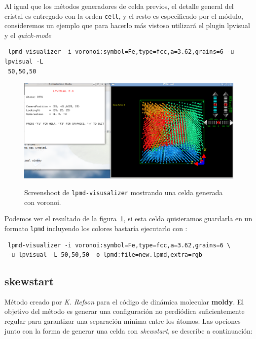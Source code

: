 
Al igual que los m\'etodos generadores de celda previos, el detalle general del
cristal es entregado con la orden \verb|cell|, y el resto es especificado por el
m\'odulo, consideremos un ejemplo que para hacerlo m\'as vistoso utilizar\'a el
plugin lpvisual y el \textit{quick-mode}

\begin{verbatim}
 lpmd-visualizer -i voronoi:symbol=Fe,type=fcc,a=3.62,grains=6 -u lpvisual -L 
 50,50,50
\end{verbatim}

\begin{figure}[h!]
 \centering
 \includegraphics[scale=.35]{voronoi-1.png}
 \label{fig:voronoi-1}
 \caption{Screenshoot de \texttt{lpmd-visusalizer} mostrando una celda generada
con voronoi.}
\end{figure}

Podemos ver el resultado de la figura~\ref{fig:voronoi-1}, si esta celda
quisieramos guardarla en un formato \verb|lpmd| incluyendo los colores
bastar\'ia ejecutarlo con :

 \begin{verbatim}
 lpmd-visualizer -i voronoi:symbol=Fe,type=fcc,a=3.62,grains=6 \
 -u lpvisual -L 50,50,50 -o lpmd:file=new.lpmd,extra=rgb
\end{verbatim}

\subsection{skewstart}
M\'etodo creado por \textit{K. Refson} para el c\'odigo de din\'amica molecular
\textbf{moldy}. El objetivo del m\'etodo es generar una configuraci\'on no
perdi\'odica suficientemente regular para garantizar una separaci\'on m\'inima
entre los \'atomos. Las opciones junto con la forma de generar una celda con
\textit{skewstart}, se describe a continuaci\'on:

